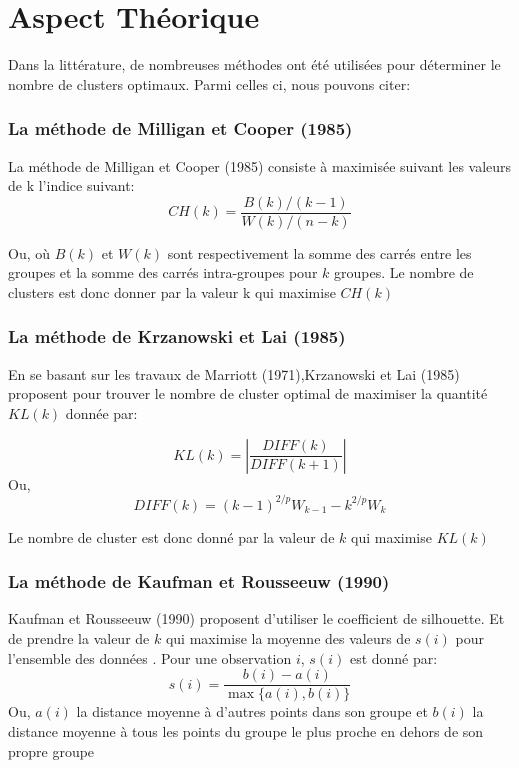 \chapter{Aspect Théorique}

Dans la littérature, de nombreuses méthodes ont été utilisées pour déterminer le nombre de clusters optimaux. Parmi celles ci, nous pouvons citer:

\subsection*{La méthode de Milligan et Cooper (1985)}

La méthode de Milligan et Cooper (1985) consiste à maximisée suivant les valeurs de k l'indice suivant:
\[
CH(k)=\frac{B(k)/(k - 1)}{W(k)/(n - k)}
\]

Ou, où \(B(k)\) et \(W(k)\) sont respectivement la somme des carrés entre les groupes et la somme des carrés intra-groupes pour \(k\) groupes. Le nombre de clusters est donc donner par la valeur k qui maximise \(CH(k)\)

\subsection*{La méthode de  Krzanowski et Lai (1985)}

En se basant sur les travaux de Marriott (1971),Krzanowski et Lai (1985) proposent pour trouver le nombre de cluster optimal de maximiser la quantité \(KL(k)\) donnée par:

\[
KL(k)=\left|\frac{DIFF(k)}{DIFF(k + 1)}\right|
\]
Ou,
\[
DIFF(k)=(k - 1)^{2 / p}W_{k - 1}-k^{2 / p}W_{k}
\]

Le nombre de cluster est donc donné par la valeur de \(k\) qui maximise \(KL(k)\)

\subsection*{La méthode de Kaufman et Rousseeuw (1990)}

Kaufman et Rousseeuw (1990) proposent d'utiliser le coefficient de silhouette. Et de prendre la valeur de \(k\) qui maximise la moyenne des valeurs de \(s(i)\) pour l'ensemble des données . Pour une observation \(i\), \(s(i)\) est donné par:
\[
s(i)=\frac{b(i)-a(i)}{\max \{a(i), b(i)\}}
\]
Ou, \(a(i)\) la distance moyenne à d'autres points dans son groupe et \(b(i)\) la distance moyenne à tous les points du groupe le plus proche en dehors de son propre groupe

